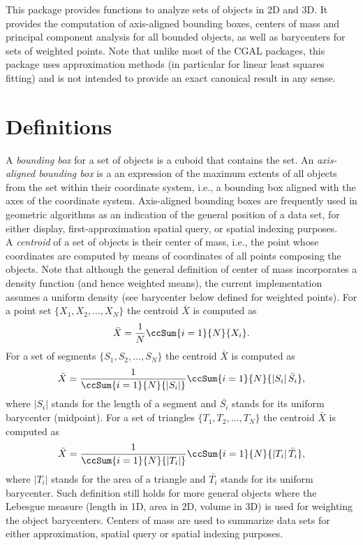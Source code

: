 This package provides functions to analyze sets of objects in 2D and 3D. It provides the computation of axis-aligned bounding boxes, centers of mass and principal component analysis for all bounded objects, as well as barycenters for sets of weighted points. Note that unlike most of the CGAL packages, this package uses approximation methods (in particular for linear least squares fitting) and is not intended to provide an exact canonical result in any sense. 

\section{Definitions}

A \emph{bounding box} for a set of objects is a cuboid that contains the set. An \emph{axis-aligned bounding box} is a an expression of the maximum extents of all objects from the set within their coordinate system, i.e., a bounding box aligned with the axes of the coordinate system. Axis-aligned bounding boxes are frequently used in geometric algorithms as an indication of the general position of a data set, for either display, first-approximation spatial query, or spatial indexing purposes. \\

A \emph{centroid} of a set of objects is their center of mass, i.e., the point whose coordinates are computed by means of coordinates of all points composing the objects. Note that although the general definition of center of mass incorporates a density function (and hence weighted means), the current implementation assumes a uniform density (see barycenter below defined for weighted points). For a point set $\{X_1,X_2,...,X_N\}$ the centroid $\bar{X}$ is computed as $$\bar{X} = \frac{1}{N} \ccSum{i=1}{N}{ X_i}.$$ For a set of segments $\{S_1,S_2,...,S_N\}$ the centroid $\bar{X}$ is computed as $$\bar{X} = \frac{1}{\ccSum{i=1}{N}{\left|S_i\right|}} \ccSum{i=1}{N}{ \left|S_i\right| \bar{S_i}},$$ where $\left|S_i\right|$ stands for the length of a segment and $\bar{S_i}$ stands for its uniform barycenter (midpoint). For a set of triangles $\{T_1,T_2,...,T_N\}$ the centroid $\bar{X}$ is computed as $$\bar{X} = \frac{1}{\ccSum{i=1}{N}{\left|T_i\right|}} \ccSum{i=1}{N}{ \left|T_i\right| \bar{T_i}},$$ where $\left|T_i\right|$ stands for the area of a triangle and $\bar{T_i}$ stands for its uniform barycenter. Such definition still holds for more general objects where the Lebesgue measure (length in 1D, area in 2D, volume in 3D) is used for weighting the object barycenters. Centers of mass are used to summarize data sets for either approximation, spatial query or spatial indexing purposes.\\


